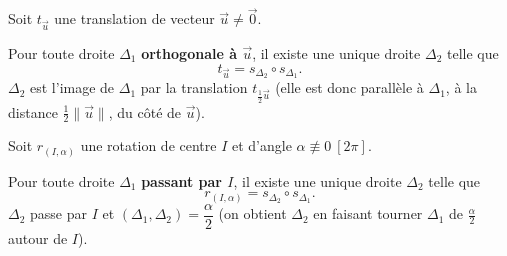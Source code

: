 \begin{theoreme}
	Soit $t_{\vec u}$ une translation de vecteur $\vec u\neq\vec 0$.

	Pour toute droite $\Delta_1$ \textbf{orthogonale à $\vec u$}, il existe une
	unique droite $\Delta_2$ telle que
	$$
	t_{\vec u} = s_{\Delta_2}\circ s_{\Delta_1}.
	$$
	$\Delta_2$ est l'image de $\Delta_1$ par la translation $t_{\frac12\vec u}$
	(elle est donc parallèle à $\Delta_1$, à la distance $\tfrac12\|\vec u\|$,
	du côté de $\vec u$).
\end{theoreme}

\begin{center}
\end{center}

\begin{theoreme}
	Soit $r_{(I,\alpha)}$ une rotation de centre $I$ et d'angle $\alpha\not\equiv 0\ [2\pi]$.

	Pour toute droite $\Delta_1$ \textbf{passant par $I$}, il existe une unique
	droite $\Delta_2$ telle que
	$$
	r_{(I,\alpha)} = s_{\Delta_2}\circ s_{\Delta_1}.
	$$
	$\Delta_2$ passe par $I$ et $(\Delta_1,\Delta_2)=\dfrac{\alpha}{2}$
	(on obtient $\Delta_2$ en faisant tourner $\Delta_1$ de $\tfrac{\alpha}{2}$
	autour de $I$).
\end{theoreme}

